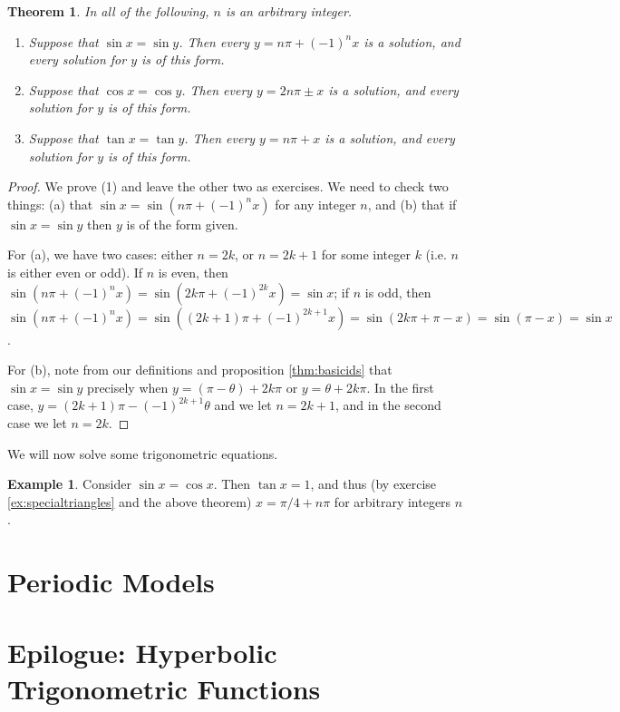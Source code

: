 \documentclass[a4paper,leqno]{article}
\numberwithin{equation}{section}
\newtheorem{thm}[equation]{Theorem}
\theoremstyle{definition}
\newtheorem{ex}[equation]{Example}
\theoremstyle{remark}
\begin{document}
\begin{thm}\leavevmode
  In all of the following, $n $ is an arbitrary integer.
  \begin{enumerate}
    \item Suppose that $ \sin x = \sin y $. Then every $ y = n\pi + (-1)^n x $ is a solution, and every solution for $ y $ is of this form.
    \item Suppose that $ \cos x = \cos y $. Then every $ y = 2n\pi \pm x $ is a solution, and every solution for $ y $ is of this form.
    \item Suppose that $ \tan x = \tan y $. Then every $ y = n\pi + x $ is a solution, and every solution for $ y $ is of this form.
  \end{enumerate}
\end{thm}
\begin{proof}
  We prove (1) and leave the other two as exercises. We need to check two things: (a) that $ \sin x = \sin (n\pi + (-1)^n x) $ for any integer $ n $,
  and (b) that if $ \sin x = \sin y $ then $ y $ is of the form given.

  For (a), we have two cases: either $ n = 2k $, or $ n = 2k + 1 $ for some integer $ k $ (i.e. $ n $ is either even or odd). If $ n $ is
  even, then $ \sin(n\pi + (-1)^n x) = \sin(2k\pi + (-1)^{2k} x) = \sin x $; if $ n $ is odd,
  then $ \sin(n\pi + (-1)^n x) = \sin((2k + 1)\pi + (-1)^{2k + 1}x) = \sin(2k\pi + \pi - x) = \sin(\pi - x) = \sin x $.

  For (b), note from our definitions and proposition \ref{thm:basicids} that $ \sin x = \sin y $ precisely when $ y = (\pi - \theta) + 2k\pi $
  or $ y = \theta + 2k\pi $. In the first case, $ y = (2k + 1)\pi - (-1)^{2k + 1} \theta $ and we let $ n = 2k + 1 $, and in the second case
  we let $ n = 2k $.
\end{proof}

We will now solve some trigonometric equations.
\begin{ex}
  Consider $ \sin x = \cos x $. Then $ \tan x = 1 $, and thus (by exercise \ref{ex:specialtriangles} and the above theorem) $ x = \pi/4 + n\pi $
  for arbitrary integers $ n $.
\end{ex}

\section{Periodic Models}

\section{Epilogue: Hyperbolic Trigonometric Functions}
\end{document}
